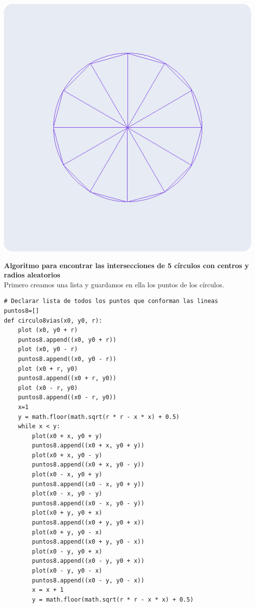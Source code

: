 \documentclass[a4paper]{article}
\begin{document}
\begin{center}
\includegraphics[width=15cm]{src/tarea1.png}\\
\end{center}
\newpage
\Large{\textbf{Algoritmo para encontrar las intersecciones de 5 círculos con centros y radios aleatorios}}\\[0.5cm]
Primero  creamos una lista y guardamos en ella los puntos de los círculos.
\begin{center}
\begin{mycodeboxl}
\begin{lstlisting}
# Declarar lista de todos los puntos que conforman las lineas
puntos8=[]
def circulo8vias(x0, y0, r):
    plot (x0, y0 + r)
    puntos8.append((x0, y0 + r))
    plot (x0, y0 - r)
    puntos8.append((x0, y0 - r))
    plot (x0 + r, y0)
    puntos8.append((x0 + r, y0))
    plot (x0 - r, y0)
    puntos8.append((x0 - r, y0))
    x=1
    y = math.floor(math.sqrt(r * r - x * x) + 0.5)
    while x < y:
        plot(x0 + x, y0 + y)
        puntos8.append((x0 + x, y0 + y))
        plot(x0 + x, y0 - y)
        puntos8.append((x0 + x, y0 - y))
        plot(x0 - x, y0 + y)
        puntos8.append((x0 - x, y0 + y))
        plot(x0 - x, y0 - y)
        puntos8.append((x0 - x, y0 - y))
        plot(x0 + y, y0 + x)
        puntos8.append((x0 + y, y0 + x))
        plot(x0 + y, y0 - x)
        puntos8.append((x0 + y, y0 - x))
        plot(x0 - y, y0 + x)
        puntos8.append((x0 - y, y0 + x))
        plot(x0 - y, y0 - x)
        puntos8.append((x0 - y, y0 - x))
        x = x + 1
        y = math.floor(math.sqrt(r * r - x * x) + 0.5)
\end{lstlisting}
\end{mycodeboxl}
\end{center}
\end{document}
